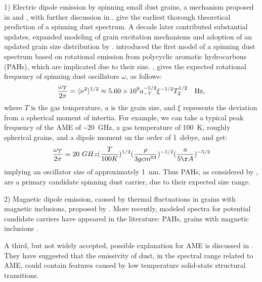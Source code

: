     1) Electric dipole emission by spinning small dust grains, a mechanism proposed in \cite{erickson57} and \cite{hoyle70}, with further discussion in \cite{ferrara94}. \cite{draine98b} give the earliest thorough theoretical prediction of a spinning dust spectrum. A decade later \cite{ali-haimoud09} contributed substantial updates, expanded modeling of grain excitation mechanisms and adoption of an updated grain size distribution by \cite{weingartner01}. \cite{ysard10a} introduced the first model of a spinning dust spectrum based on rotational emission from polycyclic aromatic hydrocarbons (PAHs), which are implicated due to their size.  \cite{draine98b}, gives the expected rotational frequency of spinning dust oscillators $\omega$,  as follows:
        \begin{equation}
        {\omega_T\over 2\pi} =
        \langle\nu^2\rangle^{1/2}
        \approx 5.60\times 10^9 a_{-7}^{-5/2}\xi^{-1/2}T_2^{1/2}~~~{\rm Hz},
        \label{eq:nurms}
        \end{equation}
    where $T$ is the gas temperature, $a$ is the grain size, and $\xi$ represents the deviation from a spherical moment of intertia. For example, we can take a typical peak frequency of the AME of \textasciitilde{}20~GHz, a gas temperature of 100~K, roughly spherical grains, and a dipole moment on the order of 1~debye, and get:
        \begin{equation}
            {\omega_T\over 2\pi} =
                20~GHz({T\over 100K})^{1/2}({\rho \over{3gcm^{03}}})^{-1/2}({a\over 5\AA{}})^{-5/2}
            \label{eq:nurms_ex}
        \end{equation}
    implying an oscillator size of approximately 1~nm. Thus PAHs, as considered by \cite{ysard10a}, are a primary candidate spinning dust carrier, due to their expected size range.

    2) Magnetic dipole emission, caused by thermal fluctuations in grains with magnetic inclusions, proposed by \cite{draine99}.
     More recently, modeled spectra for potential candidate carriers have appeared in the literature: PAHs, grains with magnetic inclusions \citep{draine13, ali-haimoud14, hoang16a}.

    A third, but not widely accepted, possible explanation for AME is discussed in \cite{jones09}. They have suggested that the emissivity of dust, in the spectral range related to AME, could contain features caused by low temperature solid-state structural transitions.

